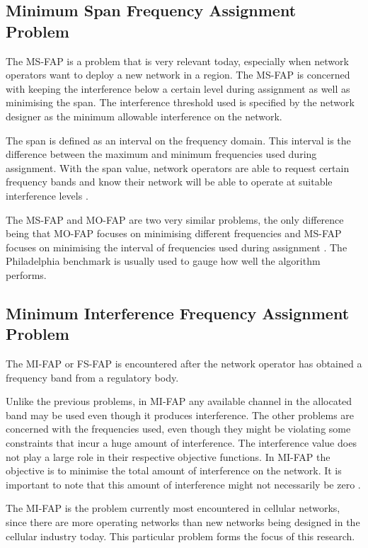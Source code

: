 \subsection{Minimum Span Frequency Assignment Problem}
The \gls{MS-FAP} is a problem that is very relevant today, especially when network operators want to deploy a new network in a region\cite{Karen2004}. The \gls{MS-FAP} is concerned with keeping the interference below a certain level during assignment as well as minimising the span\cite{MSFAP}. The interference threshold used is specified by the network designer as the minimum allowable interference on the network\cite{MSFAP}.

The span is defined as an interval on the frequency domain. This interval is the difference between the maximum and minimum frequencies used during assignment\cite{Karen2004,MSFAP}. With the span value, network operators are able to request certain frequency bands and know their network will be able to operate at suitable interference levels \cite{Karen2004,MSFAP}.

The \gls{MS-FAP} and \gls{MO-FAP} are two very similar problems, the only difference being that \gls{MO-FAP} focuses on minimising different frequencies and \gls{MS-FAP} focuses on minimising the interval of frequencies used during assignment \cite{Karen2004}. The Philadelphia benchmark is usually used to gauge how well the algorithm performs.
\subsection{Minimum Interference Frequency Assignment Problem}
The \gls{MI-FAP} or \gls{FS-FAP} is encountered after the network operator has obtained a frequency band from a regulatory body\cite{Karen2004}.

Unlike the previous problems, in \gls{MI-FAP} any available channel in the allocated band may be used even though it produces interference. The other problems are concerned with the frequencies used, even though they might be violating some constraints that incur a huge amount of interference\cite{MontemanniThesis,MultipleBinaryFAP}. The interference value does not play a large role in their respective objective functions\cite{Eisenblatter,MultipleBinaryFAP}. In \gls{MI-FAP} the objective is to minimise the total amount of interference on the network. It is important to note that this amount of interference might not necessarily be zero \cite{Karen2004,Eisenblatter}.

The \gls{MI-FAP} is the problem currently most encountered in cellular networks, since there are more operating networks than new networks being designed in the cellular industry today\cite{Karen2004}. This particular problem forms the focus of this research. 

